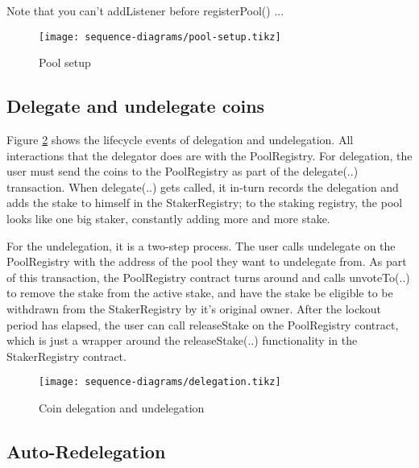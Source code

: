 Note that you can't addListener before registerPool() ...

\begin{figure}[ht]
\centering
\texttt{[image: sequence-diagrams/pool-setup.tikz]}
\caption{Pool setup}
\label{fig:pool_setup}
\end{figure}
\clearpage

\subsection{Delegate and undelegate coins}

Figure \ref{fig:delegation} shows the lifecycle events of delegation and undelegation. All interactions that the delegator does are with the PoolRegistry. For delegation, the user must send the coins to the PoolRegistry as part of the delegate(..) transaction. When delegate(..) gets called, it in-turn records the delegation and adds the stake to himself in the StakerRegistry; to the staking registry, the pool looks like one big staker, constantly adding more and more stake. 

For the undelegation, it is a two-step process. The user calls undelegate on the PoolRegistry with the address of the pool they want to undelegate from. As part of this transaction, the PoolRegistry contract turns around and calls unvoteTo(..) to remove the stake from the active stake, and have the stake be eligible to be withdrawn from the StakerRegistry by it's original owner. After the lockout period has elapsed, the user can call releaseStake on the PoolRegistry contract, which is just a wrapper around the releaseStake(..) functionality in the StakerRegistry contract. 

\begin{figure}[ht]
\centering
\texttt{[image: sequence-diagrams/delegation.tikz]}
\caption{Coin delegation and undelegation}
\label{fig:delegation}
\end{figure}
\clearpage

\subsection{Auto-Redelegation}


